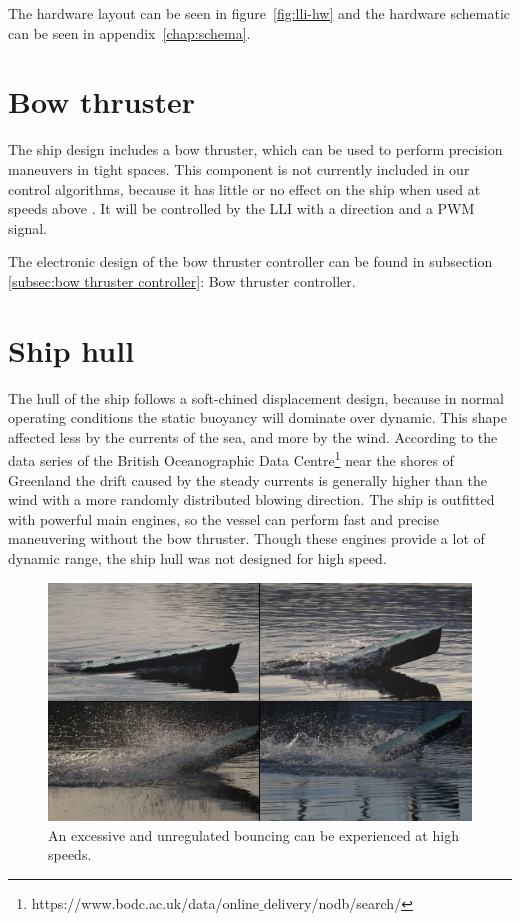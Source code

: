 The hardware layout can be seen in figure~\vref{fig:lli-hw} and the hardware schematic can be seen in appendix~\vref{chap:schema}.



\section{Bow thruster}
The ship design includes a bow thruster, which can be used to perform precision maneuvers in tight spaces. This component is not currently included in our control algorithms, because it has little or no effect on the ship when used at speeds above . It will be controlled by the \ac{LLI} with a direction and a \ac{PWM} signal. 

The electronic design of the bow thruster controller can be found in subsection \ref{subsec:bow thruster controller}: Bow thruster controller.

\section{Ship hull}

The hull of the ship follows a soft-chined displacement design, because in normal operating conditions the static buoyancy will dominate over dynamic. This shape affected less by the currents of the sea, and more by the wind. According to the data series of the British Oceanographic Data Centre\footnote[1]{https://www.bodc.ac.uk/data/online$\_$delivery/nodb/search/} near the shores of Greenland the drift caused by the steady currents is generally higher than the wind with a more randomly distributed blowing direction.
The ship is outfitted with powerful main engines, so the vessel can perform fast and precise maneuvering without the bow thruster. Though these engines provide a lot of dynamic range, the ship hull was not designed for high speed.

\begin{figure}[jumping]
	\centering
	\includegraphics[width=\textwidth]{Pictures/VerticalJumpingTele.jpg}
	\caption{An excessive and unregulated bouncing can be experienced at high speeds.}
	\label{fig:vessel-block-overview}
\end{figure}

